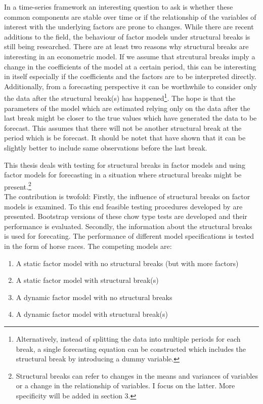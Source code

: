 \documentclass[12pt]{article}
\begin{document}
In a time-series framework an interesting question to ask is whether these common components are stable over time or if the relationship of the variables of interest with the underlying factors are prone to changes. While there are recent additions to the field, the behaviour of factor models under structural breaks is still being researched. There are at least two reasons why structural breaks are interesting in an econometric model. If we assume that strcutural breaks imply a change in the coefficients of the model at a certain period, this can be interesting in itself especially if the coefficients and the factors are to be interpreted directly. Additionally, from a forecasting perspective it can be worthwhile to consider only the data after the structural break(s) has happened\footnote{Alternatively, instead of splitting the data into multiple periods for each break, a single forecasting equation can be constructed which includes the structural break by introducing a dummy variable.}. The hope is that the parameters of the model which are estimated relying only on the data after the last break might be closer to the true values which have generated the data to be forecast. This assumes that there will not be another structural break at the period which is be forecast. It should be notet that \citet{pesaran2007selection} have shown that it can be slightly better to include same observations before the last break.

This thesis deals with testing for structural breaks in factor models and using factor models for forecasting in a situation where structural breaks might be present.\footnote{Structural breaks can refer to changes in the means and variances of variables or a change in the relationship of variables. I focus on the latter. More specificity will be added in section 3.} \\
The contribution is twofold: Firstly, the influence of structural breaks on factor models is examined. To this end feasible testing procedures developed by \citet{breitung2011testing} are presented. Bootstrap versions of these chow type tests are developed and their performance is evaluated. Secondly, the information about the structural breaks is used for forecating. The performance of different model specifications is tested in the form of horse races. The competing models are:
\begin{enumerate}
	\item A static factor model with no structural breaks (but with more factors)
	\item A static factor model with structural break(s)
	\item A dynamic factor model with no structural breaks
	\item A dynamic factor model with structural break(s)
\end{enumerate}
\end{document}
